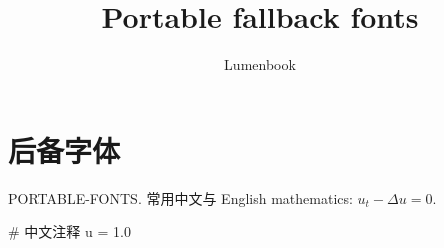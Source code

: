 \documentclass[fonts=tex,language=chinese]{lumenbook}
\title{Portable fallback fonts}
\author{Lumenbook}
\begin{document}
\chapter{后备字体}
PORTABLE-FONTS. 常用中文与 English mathematics: $u_t-\Delta u=0$.
\begin{codeblock}[language=Python]
# 中文注释
u = 1.0
\end{codeblock}
\end{document}
